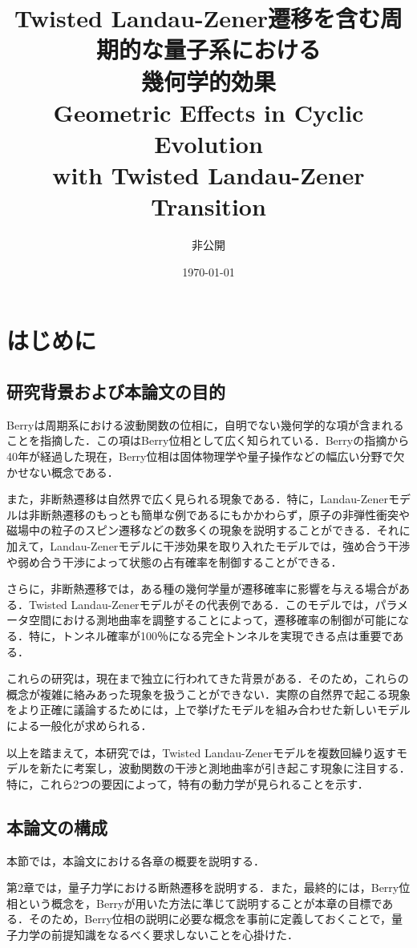 \documentclass[a4paper, titlepage]{jsreport}
\title{Twisted Landau-Zener遷移を含む周期的な量子系における\\幾何学的効果\\
Geometric Effects in Cyclic Evolution \\with Twisted Landau-Zener Transition}
\author{非公開}
\date{\today}
\begin{document}
 
\maketitle
\tableofcontents
\newpage
\chapter{はじめに}

\section{研究背景および本論文の目的}

Berryは周期系における波動関数の位相に，自明でない幾何学的な項が含まれることを指摘した\cite{Berry1984}．この項はBerry位相として広く知られている．Berryの指摘から40年が経過した現在，Berry位相は固体物理学や量子操作などの幅広い分野で欠かせない概念である．


また，非断熱遷移は自然界で広く見られる現象である．特に，Landau-Zenerモデルは非断熱遷移のもっとも簡単な例であるにもかかわらず，原子の非弾性衝突や磁場中の粒子のスピン遷移などの数多くの現象を説明することができる\cite{Zener}．それに加えて，Landau-Zenerモデルに干渉効果を取り入れたモデルでは，強め合う干渉や弱め合う干渉によって状態の占有確率を制御することができる\cite{Kayanuma1993}．


さらに，非断熱遷移では，ある種の幾何学量が遷移確率に影響を与える場合がある\cite{Berry1990}．Twisted Landau-Zenerモデルがその代表例である．このモデルでは，パラメータ空間における測地曲率を調整することによって，遷移確率の制御が可能になる\cite{Oka}．特に，トンネル確率が100％になる完全トンネルを実現できる点は重要である．


これらの研究は，現在まで独立に行われてきた背景がある．そのため，これらの概念が複雑に絡みあった現象を扱うことができない．実際の自然界で起こる現象をより正確に議論するためには，上で挙げたモデルを組み合わせた新しいモデルによる一般化が求められる．


以上を踏まえて，本研究では，Twisted Landau-Zenerモデルを複数回繰り返すモデルを新たに考案し，波動関数の干渉と測地曲率が引き起こす現象に注目する．特に，これら2つの要因によって，特有の動力学が見られることを示す．

\section{本論文の構成}
本節では，本論文における各章の概要を説明する．


第2章では，量子力学における断熱遷移を説明する．また，最終的には，Berry位相という概念を，Berryが用いた方法に準じて説明することが本章の目標である．そのため，Berry位相の説明に必要な概念を事前に定義しておくことで，量子力学の前提知識をなるべく要求しないことを心掛けた．
\end{document}
